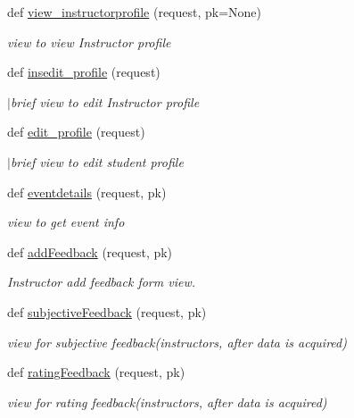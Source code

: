 \begin{DoxyCompactItemize}
def \hyperlink{namespaceviews_a868d93f5891889b35b8fb82a8f855537}{view\+\_\+instructorprofile} (request, pk=None)
\begin{DoxyCompactList}\small\item\em view to view Instructor profile \end{DoxyCompactList}\item 
def \hyperlink{namespaceviews_a9122b6685c66b83c0af0410901c1cb0f}{insedit\+\_\+profile} (request)
\begin{DoxyCompactList}\small\item\em $\vert$brief view to edit Instructor profile \end{DoxyCompactList}\item 
def \hyperlink{namespaceviews_ab32280c40999e164eeba847e096f8d43}{edit\+\_\+profile} (request)
\begin{DoxyCompactList}\small\item\em $\vert$brief view to edit student profile \end{DoxyCompactList}\item 
def \hyperlink{namespaceviews_a0e9fcb12c53e7536e352f4b2767248a3}{eventdetails} (request, pk)
\begin{DoxyCompactList}\small\item\em view to get event info \end{DoxyCompactList}\item 
def \hyperlink{namespaceviews_a1e83bef6cc5ef0600c12501630e13fbd}{add\+Feedback} (request, pk)
\begin{DoxyCompactList}\small\item\em Instructor add feedback form view. \end{DoxyCompactList}\item 
def \hyperlink{namespaceviews_a8bfcaaf5a7ee8d25b46c497ea4a6451e}{subjective\+Feedback} (request, pk)
\begin{DoxyCompactList}\small\item\em view for subjective feedback(instructor\textquotesingle{}s, after data is acquired) \end{DoxyCompactList}\item 
def \hyperlink{namespaceviews_a28ec9f86f7b348dd4cdd042c42c4c262}{rating\+Feedback} (request, pk)
\begin{DoxyCompactList}\small\item\em view for rating feedback(instructor\textquotesingle{}s, after data is acquired) \end{DoxyCompactList}\item 

\end{DoxyCompactItemize}
